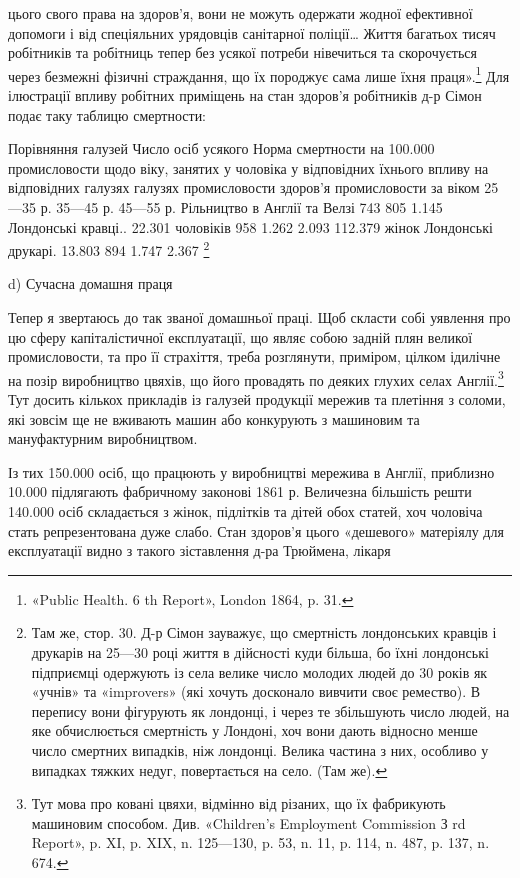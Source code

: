 \parcont{}  %
цього свого права на здоров’я, вони не можуть одержати жодної
ефективної допомоги і від спеціяльних урядовців санітарної
поліції\dots{} Життя багатьох тисяч робітників та робітниць тепер
без усякої потреби нівечиться та скорочується через безмежні
фізичні страждання, що їх породжує сама лише їхня праця».\footnote{
«Public Health. 6 th Report», London 1864, p. 31.
}
Для ілюстрації впливу робітних приміщень на стан здоров’я
робітників д-р Сімон подає таку таблицю смертности:

Порівняння галузей     Число осіб усякого         Норма смертности на 100.000
промисловости щодо   віку, занятих у                чоловіка у відповідних
їхнього впливу на         відповідних галузях      галузях промисловости
здоров'я                           промисловости                за віком
                                                                                          25—35 р.
      35—45 р.         45—55 р.
Рільництво в Англії
та Велзі                                  743
   805               1.145
Лондонські кравці..       22.301 чоловіків                        958                1.262
    2.093
                                              112.379 жінок
Лондонські друкарі.            13.803                                     894                 1.747
            2.367 \footnote{
Там же, стор. 30. Д-р Сімон зауважує, що смертність лондонських
кравців і друкарів на 25—30 році життя в дійсності куди більша,
бо їхні лондонські підприємці одержують із села велике число молодих
людей до 30 років як «учнів» та «improvers» (які хочуть досконало вивчити
своє ремество). В перепису вони фігурують як лондонці, і через те
збільшують число людей, на яке обчислюється смертність у Лондоні,
хоч вони дають відносно менше число смертних випадків, ніж лондонці.
Велика частина з них, особливо у випадках тяжких недуг, повертається
на село. (Там же).
}

d) Сучасна домашня праця

Тепер я звертаюсь до так званої домашньої праці. Щоб скласти
собі уявлення про цю сферу капіталістичної експлуатації, що
являє собою задній плян великої промисловости, та про її страхіття,
треба розглянути, приміром, цілком ідилічне на позір виробництво
цвяхів, що його провадять по деяких глухих селах Англії.\footnote{
Тут мова про ковані цвяхи, відмінно від різаних, що їх фабрикують
машиновим способом. Див. «Children’s Employment Commission
З rd Report», p. XI, p. XIX, n. 125—130, p. 53, n. 11, p. 114, n. 487,
p. 137, n. 674.
}
Тут досить кількох прикладів із галузей продукції мережив та
плетіння з соломи, які зовсім ще не вживають машин або конкурують
з машиновим та мануфактурним виробництвом.

Із тих 150.000 осіб, що працюють у виробництві мережива в
Англії, приблизно 10.000 підлягають фабричному законові 1861 р.
Величезна більшість решти 140.000 осіб складається з жінок,
підлітків та дітей обох статей, хоч чоловіча стать репрезентована
дуже слабо. Стан здоров’я цього «дешевого» матеріялу для експлуатації
видно з такого зіставлення д-ра Трюймена, лікаря
\parbreak{}  %
